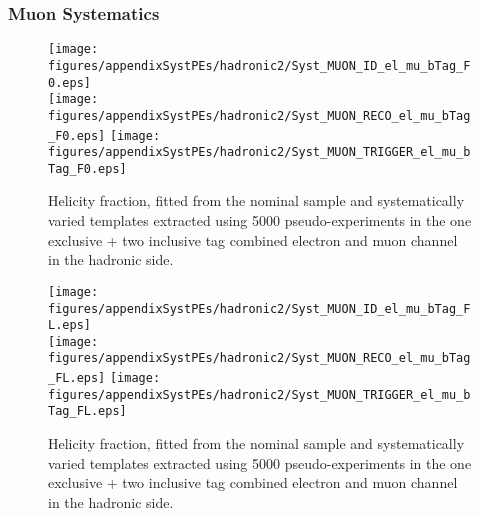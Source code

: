 \subsubsection{Muon Systematics}
\begin{figure}[!hb]
\begin{center}
        \texttt{[image: figures/appendixSystPEs/hadronic2/Syst\_MUON\_ID\_el\_mu\_bTag\_F0.eps]}\\
        \texttt{[image: figures/appendixSystPEs/hadronic2/Syst\_MUON\_RECO\_el\_mu\_bTag\_F0.eps]}
        \texttt{[image: figures/appendixSystPEs/hadronic2/Syst\_MUON\_TRIGGER\_el\_mu\_bTag\_F0.eps]}        
\caption{Helicity fraction, \fo fitted from the nominal \ttbar sample and systematically varied templates extracted using 5000 pseudo-experiments in the one exclusive + two inclusive \bt tag combined electron and muon channel in the hadronic side. }
\label{fig:systematicVar_lep_f0_elmu2incl_MUON}
\end{center}
\end{figure}

\begin{figure}[!hb]
\begin{center}
        \texttt{[image: figures/appendixSystPEs/hadronic2/Syst\_MUON\_ID\_el\_mu\_bTag\_FL.eps]}\\
        \texttt{[image: figures/appendixSystPEs/hadronic2/Syst\_MUON\_RECO\_el\_mu\_bTag\_FL.eps]}
        \texttt{[image: figures/appendixSystPEs/hadronic2/Syst\_MUON\_TRIGGER\_el\_mu\_bTag\_FL.eps]}        
\caption{Helicity fraction, \fl fitted from the nominal \ttbar sample and systematically varied templates extracted using 5000 pseudo-experiments in the one exclusive + two inclusive \bt tag combined electron and muon channel in the hadronic side. }
\label{fig:systematicVar_lep_fL_elmu2incl_MUON}
\end{center}
\end{figure}

